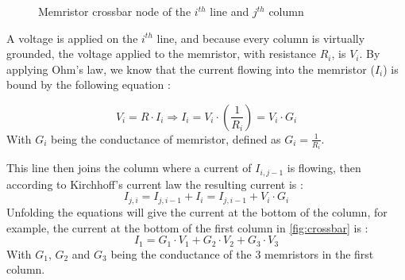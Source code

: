 \begin{figure}[t]
  \centering
  
  \caption{Memristor crossbar node of the $i^{th}$ line and $j^{th}$ column}
  \label{fig:crossNode}
\end{figure}

A voltage is applied on the $i^{th}$ line, and because every column is virtually grounded, the voltage applied to the memristor, with resistance $R_i$, is $V_i$. By applying Ohm's law, we know that the current flowing into the memristor ($I_{i}$) is bound by the following equation :

\begin{equation}
  V_i = R\cdot I_{i} \Rightarrow I_{i} = V_i\cdot (\frac{1}{R_i})= V_i\cdot G_i
\end{equation}
With $ G_i$ being the conductance of memristor, defined as $ G_i=\frac{1}{R_i}$.

This line then joins the column where a current of $I_{i,j-1}$ is flowing, then according to Kirchhoff's current law the resulting current is :
\begin{equation}
  I_{j,i} = I_{j,i-1}+I_{i} = I_{j,i-1} + V_i\cdot G_i
\end{equation}
Unfolding the equations will give the current at the bottom of the column, for example, the current at the bottom of the first column in \cref{fig:crossbar} is :
\begin{equation}
  I_1= G_1\cdot V_1 +  G_2\cdot V_2 +  G_3\cdot V_3
\end{equation}
With $ G_1$, $ G_2$ and $ G_3$ being the conductance of the 3 memristors in the first column.
